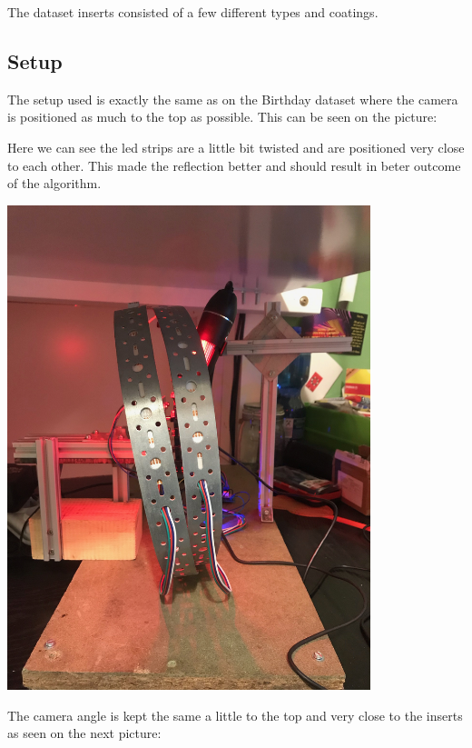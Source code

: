 \documentclass{scrartcl}
\begin{document}
The dataset inserts consisted of a few different types and coatings. 



\subsection{Setup}

The setup used is exactly the same as on the Birthday dataset where the camera is positioned as much to the top as possible. This can be seen on the picture:

Here we can see the led strips are a little bit twisted and are positioned very close to each other. This made the reflection better and should result in beter outcome of the algorithm.



\includegraphics[width=4.166667in, keepaspectratio=true]{./2_Spaghetti_dataset/IMG_9295.jpeg}



The camera angle is kept the same a little to the top and very close to the inserts as seen on the next picture:
\end{document}

